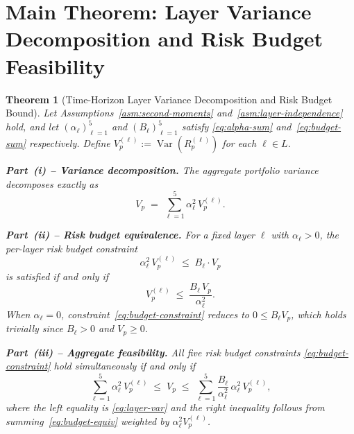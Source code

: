 \documentclass[12pt,openany]{book}
\DeclareMathOperator{\Var}{Var}
\numberwithin{equation}{chapter}
\theoremstyle{plain}
\newtheorem{theorem}{Theorem}[chapter]
\theoremstyle{definition}
\theoremstyle{remark}
\def\mathcal#1{#1}%
\begin{document}
\section{Main Theorem: Layer Variance Decomposition and
         Risk Budget Feasibility}

\begin{theorem}[Time-Horizon Layer Variance Decomposition
                and Risk Budget Bound]
\label{thm:time-horizon-layer}
Let Assumptions~\ref{asm:second-moments}
and~\ref{asm:layer-independence} hold, and let
$(\alpha_\ell)_{\ell=1}^5$ and $(B_\ell)_{\ell=1}^5$ satisfy
\eqref{eq:alpha-sum} and~\eqref{eq:budget-sum} respectively.
Define $V_p^{(\ell)} := \Var(R_p^{(\ell)})$ for each
$\ell \in \mathcal{L}$.

\noindent\textbf{Part~(i) -- Variance decomposition.}
The aggregate portfolio variance decomposes \emph{exactly} as
\begin{equation}
  V_p
  \;=\;
  \sum_{\ell=1}^{5} \alpha_\ell^2\, V_p^{(\ell)}.
  \label{eq:layer-var}
\end{equation}

\noindent\textbf{Part~(ii) -- Risk budget equivalence.}
For a fixed layer $\ell$ with $\alpha_\ell > 0$, the
per-layer risk budget constraint
\begin{equation}
  \alpha_\ell^2\, V_p^{(\ell)} \;\leq\; B_\ell\cdot V_p
  \label{eq:budget-constraint}
\end{equation}
is satisfied if and only if
\begin{equation}
  V_p^{(\ell)}
  \;\leq\;
  \frac{B_\ell\, V_p}{\alpha_\ell^2}.
  \label{eq:budget-equiv}
\end{equation}
When $\alpha_\ell = 0$, constraint~\eqref{eq:budget-constraint}
reduces to $0 \leq B_\ell V_p$, which holds trivially since
$B_\ell > 0$ and $V_p \geq 0$.

\noindent\textbf{Part~(iii) -- Aggregate feasibility.}
All five risk budget constraints
\eqref{eq:budget-constraint} hold simultaneously if and only if
\begin{equation}
  \sum_{\ell=1}^{5} \alpha_\ell^2\, V_p^{(\ell)}
  \;\leq\;
  V_p
  \;\leq\;
  \sum_{\ell=1}^{5} \frac{B_\ell}{\alpha_\ell^2}\,
  \alpha_\ell^2\, V_p^{(\ell)},
  \label{eq:aggregate-feasible}
\end{equation}
where the left equality is \eqref{eq:layer-var} and the right
inequality follows from summing~\eqref{eq:budget-equiv} weighted by
$\alpha_\ell^2 V_p^{(\ell)}$.
\end{theorem}
\end{document}
